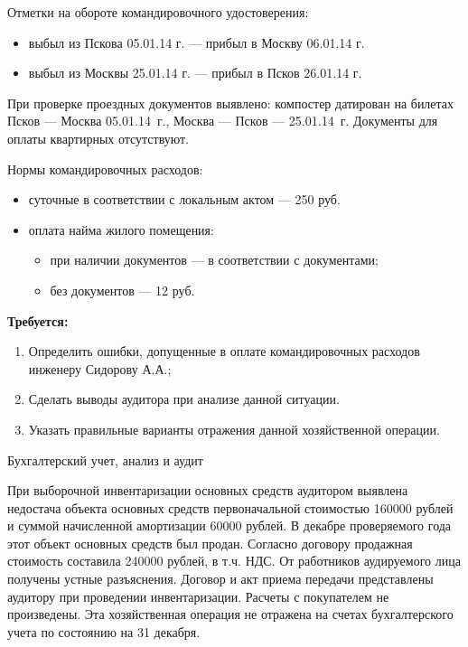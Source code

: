 \documentclass[
	11pt,
	a4paper,
	]
	{article}
\begin{document}
	Отметки на обороте командировочного удостоверения:
	\begin{itemize}
		\item выбыл из Пскова 05.01.14 г. --- прибыл в Москву 06.01.14 г.
		\item выбыл из Москвы 25.01.14 г. --- прибыл в Псков 26.01.14 г.
	\end{itemize}

	При проверке проездных документов выявлено: компостер датирован на билетах Псков --- Москва 05.01.14~г., Москва --- Псков --- 25.01.14~г. Документы для оплаты квартирных отсутствуют.
	\medskip

	Нормы командировочных расходов:
	\begin{itemize}
		\item суточные в соответствии с локальным актом --- 250 руб.
		\item оплата найма жилого помещения:
		\begin{itemize}
			\item при наличии документов --- в соответствии с документами;
			\item без документов --- 12 руб.
		\end{itemize}
	\end{itemize}

	\textbf{Требуется:}
	\begin{enumerate}
		\item Определить ошибки, допущенные в оплате командировочных расходов инженеру Сидорову А.А.;
		\item Сделать выводы аудитора при анализе данной ситуации.
		\item Указать правильные варианты отражения данной хозяйственной операции.
	\end{enumerate}

\begin{center}\lowGE * \end{center}
\newpage




 {Бухгалтерский учет, анализ и аудит}
\prGE
	
	 При выборочной инвентаризации основных средств аудитором выявлена недостача объекта основных средств первоначальной стоимостью 160000 рублей и суммой начисленной амортизации 60000 рублей. В декабре проверяемого года этот объект основных средств был продан. Согласно договору продажная стоимость составила 240000 рублей, в т.ч. НДС. От работников аудируемого лица получены устные разъяснения. Договор и акт приема передачи представлены аудитору при проведении инвентаризации. Расчеты с покупателем не произведены. Эта хозяйственная операция не отражена на счетах бухгалтерского учета по состоянию на 31 декабря. 
	 \medskip
\end{document}
